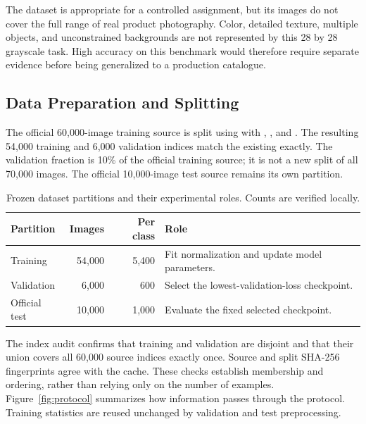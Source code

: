 The dataset is appropriate for a controlled assignment, but its images do not
cover the full range of real product photography. Color, detailed texture,
multiple objects, and unconstrained backgrounds are not represented by this
28 by 28 grayscale task. High accuracy on this benchmark would therefore
require separate evidence before being generalized to a production catalogue.

\subsection{Data Preparation and Splitting}
\label{sec:splitting}
The official 60,000-image training source is split using
 with ,
, and \cite{sklearn}.
The resulting 54,000 training and 6,000 validation indices match the existing
 exactly. The validation fraction is 10\% of the
official training source; it is not a new split of all 70,000 images.
The official 10,000-image test source remains its own partition.

\begin{table}[H]
\centering
\caption{Frozen dataset partitions and their experimental roles. Counts are verified locally.}
\label{tab:splits}
\begin{tabularx}{\linewidth}{lrrX}
\toprule
Partition & Images & Per class & Role\\
\midrule
Training & 54,000 & 5,400 & Fit normalization and update model parameters.\\
Validation & 6,000 & 600 & Select the lowest-validation-loss checkpoint.\\
Official test & 10,000 & 1,000 & Evaluate the fixed selected checkpoint.\\
\bottomrule
\end{tabularx}
\end{table}

The index audit confirms that training and validation are disjoint and that
their union covers all 60,000 source indices exactly once. Source and split
SHA-256 fingerprints agree with the cache. These checks establish membership
and ordering, rather than relying only on the number of examples.
Figure~\ref{fig:protocol} summarizes how information passes through the protocol.
Training statistics are reused unchanged by validation and test preprocessing.


